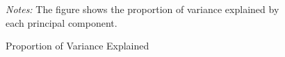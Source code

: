 \documentclass[article,11pt]{memoir}
\begin{document}
\begin{figure}[htb]\centering
  \caption{Proportion of Variance Explained}
  \label{fig:g_scree}
  \begin{measuredfigure}
  \end{measuredfigure}
  \begin{tablenotes}[flushleft]
    \item \hspace{-.2em}\emph{Notes:} The figure shows the proportion of variance explained by each principal component.
  \end{tablenotes}
\end{figure}
\end{document}
